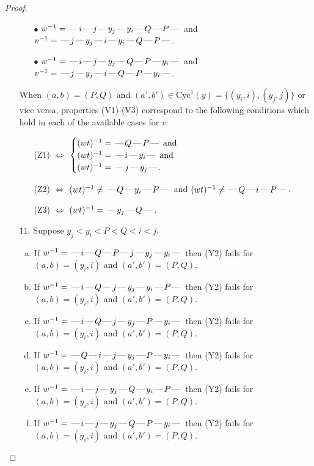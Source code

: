 \documentclass[10pt]{article}
\theoremstyle{definition}
\theoremstyle{definition}
\def\dash{\text{\hspace{0.5mm}---\hspace{0.5mm}}}
\def\Cyc{\mathrm{Cyc}}
\begin{document}
\begin{proof}
\begin{enumerate}
\begin{enumerate}
\item[$\bullet$] $w^{-1} = \dash i\dash j\dash y_j\dash y_i\dash Q\dash P\dash $ and $v^{-1} = \dash j\dash y_j\dash i\dash y_i\dash Q\dash P\dash $.
\item[$\bullet$] $w^{-1} = \dash i\dash j\dash y_j\dash Q\dash P\dash y_i\dash $ and $v^{-1} = \dash j\dash y_j\dash i\dash Q\dash P\dash y_i\dash $.
\end{enumerate}
When $(a,b)= (P,Q)$ and $(a',b')\in \Cyc^1(y)=\{(y_i,i),(y_j,j)\}$ or vice versa,
properties (V1)-(V3) correspond to the following conditions which hold in
each of the available cases for $v$:
\begin{enumerate}
\item[](Z1) $\Leftrightarrow$ $\begin{cases}\text{$(wt)^{-1} = \dash Q \dash P \dash$}\text{ and }\\
\text{$(wt)^{-1} = \dash i \dash y_i \dash$}\text{ and }\\
\text{$(wt)^{-1} = \dash j \dash y_j \dash$}.\end{cases}$
\item[](Z2) $\Leftrightarrow$ $(wt)^{-1} \neq \dash Q \dash y_i \dash P \dash$ and $(wt)^{-1}\neq \dash Q \dash i \dash P \dash$.
\item[](Z3) $\Leftrightarrow$ $(wt)^{-1} = \dash y_j \dash Q \dash$.
\end{enumerate}
\item[$11$.] Suppose $y_j < y_i < P < Q < i < j$.
\begin{enumerate}[(a)]
\item If $w^{-1} = \dash i\dash Q\dash P\dash j\dash y_j\dash y_i\dash $ then (Y2) fails for $(a,b)=(y_i,i)$ and $(a',b')=(P,Q)$.
\item If $w^{-1} = \dash i\dash Q\dash j\dash y_j\dash y_i\dash P\dash $ then (Y2) fails for $(a,b)=(y_i,i)$ and $(a',b')=(P,Q)$.
\item If $w^{-1} = \dash i\dash Q\dash j\dash y_j\dash P\dash y_i\dash $ then (Y2) fails for $(a,b)=(y_i,i)$ and $(a',b')=(P,Q)$.
\item If $w^{-1} = \dash Q\dash i\dash j\dash y_j\dash P\dash y_i\dash $ then (Y2) fails for $(a,b)=(y_i,i)$ and $(a',b')=(P,Q)$.
\item If $w^{-1} = \dash i\dash j\dash y_j\dash Q\dash y_i\dash P\dash $ then (Y2) fails for $(a,b)=(y_i,i)$ and $(a',b')=(P,Q)$.
\item If $w^{-1} = \dash i\dash j\dash y_j\dash Q\dash P\dash y_i\dash $ then (Y2) fails for $(a,b)=(y_i,i)$ and $(a',b')=(P,Q)$.

\end{enumerate}
\end{enumerate}
\end{proof}
\end{document}
